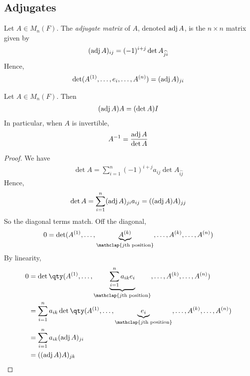 \subsection{Adjugates}
\begin{definition}
	Let $A \in M_n(F)$.
	The \textit{adjugate matrix} of $A$, denoted $\operatorname{adj} A$, is the $n \times n$ matrix given by
	\begin{align*}
		(\operatorname{adj} A)_{ij} = (-1)^{i+j} \det A_{\widehat{ji}}
	\end{align*}
	Hence,
	\begin{align*}
		\det (A^{(1)}, \dots, e_i, \dots, A^{(n)}) = (\operatorname{adj} A)_{ji}
	\end{align*}
\end{definition}
\begin{theorem}
	Let $A \in M_n(F)$.
	Then
	\begin{align*}
		(\operatorname{adj} A) A = (\det A) I
	\end{align*}
	In particular, when $A$ is invertible,
	\begin{align*}
		A^{-1} = \frac{\operatorname{adj} A}{\det A}
	\end{align*}
\end{theorem}
\begin{proof}
	We have
	\begin{align*}
		\det A = \sum_{i=1}^n (-1)^{i+j} a_{ij} \det A_{\widehat{ij}}
	\end{align*}
	Hence,
	\begin{align*}
		\det A = \sum_{i=1}^n (\operatorname{adj} A)_{ji} a_{ij} = ((\operatorname{adj} A) A)_{jj}
	\end{align*}
	So the diagonal terms match.
	Off the diagonal,
	\begin{align*}
		0 = \det(A^{(1)}, \dots, \underbrace{A^{(k)}}_{\mathclap{j\text{th position}}}, \dots, A^{(k)}, \dots, A^{(n)})
	\end{align*}
	By linearity,
	\begin{align*}
		0 & = \det\qty(A^{(1)}, \dots, \underbrace{\sum_{i=1}^n a_{ik} e_i}_{\mathclap{j\text{th position}}}, \dots, A^{(k)}, \dots, A^{(n)}) \\
		  & = \sum_{i=1}^n a_{ik} \det\qty(A^{(1)}, \dots, \underbrace{e_i}_{\mathclap{j\text{th position}}}, \dots, A^{(k)}, \dots, A^{(n)}) \\
		  & = \sum_{i=1}^n a_{ik} (\adj A)_{ji}                                                                                               \\
		  & = ((\adj A) A)_{jk}
	\end{align*}
\end{proof}

